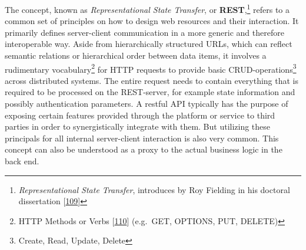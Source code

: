 \documentclass[12pt,english,a4paper,titlepage,cleardoublepage=empty,dottedtoc]{report}
\begin{document}
The concept, known as \emph{Representational State Transfer}, or
\textbf{REST},\footnote{\emph{Representational State Transfer},
  introduces by Roy Fielding in his doctoral dissertation
  {[}\protect\hyperlink{ref-web_spec_rest}{109}{]}} refers to a common
set of principles on how to design web resources and their interaction.
It primarily defines server-client communication in a more generic and
therefore interoperable way. Aside from hierarchically structured URLs,
which can reflect semantic relations or hierarchical order between data
items, it involves a rudimentary vocabulary\footnote{HTTP Methods or
  Verbs {[}\protect\hyperlink{ref-web_spec_http-methods}{110}{]}
  (e.g.~GET, OPTIONS, PUT, DELETE)} for HTTP requests to provide basic
CRUD-operations\footnote{Create, Read, Update, Delete} across
distributed systems. The entire request needs to contain everything that
is required to be processed on the REST-server, for example state
information and possibly authentication parameters. A restful API
typically has the purpose of exposing certain features provided through
the platform or service to third parties in order to synergistically
integrate with them. But utilizing these principals for all internal
server-client interaction is also very common. This concept can also be
understood as a proxy to the actual business logic in the back end.
\end{document}

